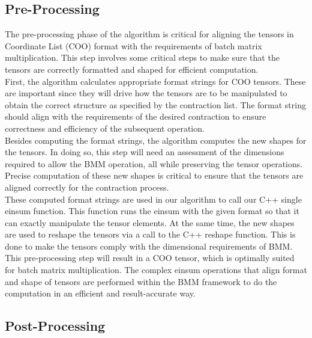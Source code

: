\subsection{Pre-Processing}
The pre-processing phase of the algorithm is critical for aligning the tensors in Coordinate List
(COO) format with the requirements of batch matrix multiplication. This step involves some critical
steps to make sure that the tensors are correctly formatted and shaped for efficient computation.\\
First, the algorithm calculates appropriate format strings for COO tensors. These are important
since they will drive how the tensors are to be manipulated to obtain the correct structure as
specified by the contraction list. The format string should align with the requirements of the
desired contraction to ensure correctness and efficiency of the subsequent operation.\\
Besides computing the format strings, the algorithm computes the new shapes for the tensors.
In doing so, this step will need an assessment of the dimensions required to allow the BMM operation,
all while preserving the tensor operations. Precise computation of these new shapes is critical
to ensure that the tensors are aligned correctly for the contraction process.\\
These computed format strings are used in our algorithm to call our C++ single einsum function.
This function runs the einsum with the given format so that it can exactly manipulate the tensor
elements. At the same time, the new shapes are used to reshape the tensors via a call to the C++
reshape function. This is done to make the tensors comply with the dimensional requirements of BMM.\\
This pre-processing step will result in a COO tensor, which is optimally suited for batch matrix
multiplication. The complex einsum operations that align format and shape of tensors are performed
within the BMM framework to do the computation in an efficient and result-accurate way.

\subsection{Post-Processing}